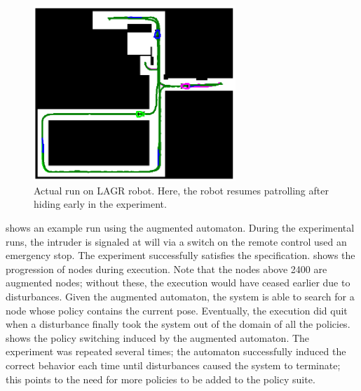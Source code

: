 \begin{figure}[bt]
  \centering 
   \includegraphics[width=3in]{graphics/AutRnd5_Run4_path.eps}

   \caption[`LAGR' timid night watch experiments.]{Actual run on
     LAGR robot.  Here, the robot resumes patrolling after hiding
     early in the experiment.}
   \label{fig:lagr_Aautomaton_experiments}
\end{figure}

 shows an example run using the augmented
automaton.  During the experimental runs, the intruder is signaled at will via a
switch on the remote control used an emergency stop.  The experiment successfully
satisfies the specification.   shows the
progression of nodes during execution.  Note that the nodes above 2400 are augmented
nodes; without these, the execution would have ceased earlier due to disturbances.
Given the augmented automaton, the system is able to search for a node whose policy
contains the current pose.  Eventually, the execution did quit when a disturbance
finally took the system out of the domain of all the policies.
 shows the policy switching induced by the
augmented automaton.  The experiment was repeated several times; the automaton
successfully induced the correct behavior each time until disturbances caused the
system to terminate; this points to the need for more policies to be added to the
policy suite.

